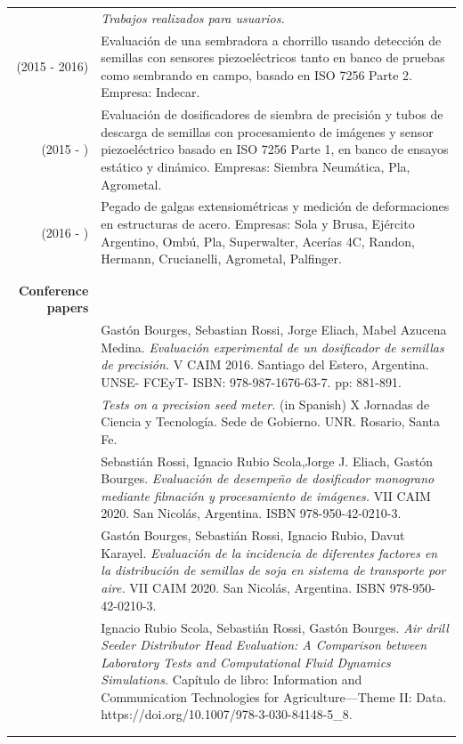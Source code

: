 \documentclass[a4paper,10pt, sans]{article}
\begin{document}
  \begin{table}[H]
  \centering
  \begin{tabularx}{\textwidth}{r X}  
        {} & \hspace{2cm} \textit{Trabajos realizados para usuarios.} \\ [1ex]
        (2015 - 2016) & Evaluación de una sembradora a chorrillo usando detección de semillas con sensores piezoeléctricos tanto en banco de pruebas como sembrando en campo, basado en ISO 7256 Parte 2. Empresa: Indecar. \\  [1ex]

        (2015 - ) & Evaluación de dosificadores de siembra de precisión y tubos de descarga de semillas con procesamiento de imágenes y sensor piezoeléctrico basado en ISO 7256 Parte 1, en banco de ensayos estático y dinámico. Empresas: Siembra Neumática, Pla, Agrometal. \\ [1ex]
        (2016 - ) & Pegado de galgas extensiométricas y medición de deformaciones en estructuras de acero. Empresas: Sola y Brusa, Ejército Argentino, Ombú, Pla, Superwalter, Acerías 4C, Randon, Hermann, Crucianelli, Agrometal, Palfinger. \\ \\ \hline \\

    \textbf{Conference papers} & {}\\ [1ex]
      {} & Gastón Bourges, Sebastian Rossi, Jorge Eliach, Mabel Azucena Medina. \textit{Evaluación experimental de un dosificador de semillas de precisión.} V CAIM 2016. Santiago del Estero, Argentina. UNSE- FCEyT- ISBN: 978-987-1676-63-7. pp: 881-891. \\  [1ex]
      {} & \textit{Tests on a precision seed meter.} (in Spanish) X Jornadas de Ciencia y Tecnología. Sede de Gobierno. UNR. Rosario, Santa Fe. \\  [1ex]
      {} & Sebastián Rossi, Ignacio Rubio Scola,Jorge J. Eliach, Gastón Bourges. \textit{Evaluación de desempeño de dosificador monograno mediante filmación y procesamiento de imágenes.} VII CAIM 2020. San Nicolás, Argentina. ISBN 978-950-42-0210-3. \\  [1ex]
      {} & Gastón Bourges, Sebastián Rossi, Ignacio Rubio, Davut Karayel. \textit{Evaluación de la incidencia de diferentes factores en la distribución de semillas de soja en sistema de transporte por aire.} VII CAIM 2020. San Nicolás, Argentina. ISBN 978-950-42-0210-3. \\ [1ex]
      {} & Ignacio Rubio Scola, Sebastián Rossi, Gastón Bourges. \textit{Air drill Seeder Distributor Head Evaluation: A Comparison between Laboratory Tests and Computational Fluid Dynamics Simulations.} Capítulo de libro: Information and Communication Technologies for Agriculture—Theme II: Data. https://doi.org/10.1007/978-3-030-84148-5_8. \\ \\ \hline \\
      

\end{tabularx}
\end{table}
\end{document}
